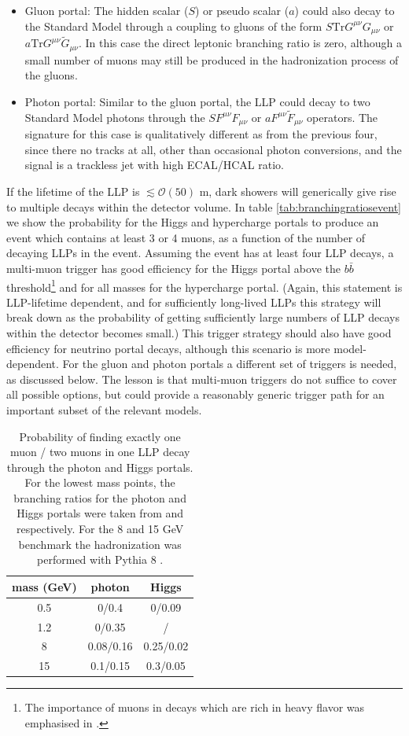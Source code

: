 \begin{itemize}
\item Gluon portal: The hidden scalar ($S$) or pseudo scalar ($a$) could also decay to the Standard Model through a coupling to gluons of the form $S \mathrm{Tr}G^{\mu\nu}G_{\mu\nu}$ or $a \mathrm{Tr}G^{\mu\nu}\tilde G_{\mu\nu}$. In this case the direct leptonic branching ratio is zero, although a small number of muons may still be produced in the hadronization process of the gluons. 

\item Photon portal: Similar to the gluon portal, the LLP could decay to two Standard Model photons through the $S F^{\mu\nu}F_{\mu\nu}$ or $a F^{\mu\nu}\tilde F_{\mu\nu}$ operators. The signature for this case is qualitatively different as from the previous four, since there no tracks at all, other than occasional photon conversions, and the signal is a trackless jet with high ECAL/HCAL ratio. 
\end{itemize}

If the lifetime of the LLP is $\lesssim \mathcal{O}(50)$ m, dark showers will generically give rise to multiple decays within the detector volume.  In table \ref{tab:branchingratiosevent} we show the probability for the Higgs and hypercharge portals to produce an event which contains at least 3 or 4 muons, as a function of the number of decaying LLPs in the event. Assuming the event has at least four LLP decays, a multi-muon trigger has good efficiency for the Higgs portal above the $b\bar b$ threshold\footnote{The importance of muons in decays which are rich in heavy flavor was emphasised in \cite{Strassler:2008fv}.} and for all masses for the hypercharge portal. (Again, this statement is LLP-lifetime dependent, and for sufficiently long-lived LLPs this strategy will break down as the probability of getting sufficiently large numbers of LLP decays within the detector becomes small.) This trigger strategy should also have good efficiency for  neutrino portal decays, although this scenario is more model-dependent. For the gluon and photon portals a different set of triggers is needed, as discussed below. The lesson is that multi-muon triggers do not suffice to cover all possible options, but could provide a reasonably generic trigger path for an important subset of the relevant models.

\begin{table}[h]\centering
\begin{tabular}{|c|cc|}\hline 
mass (GeV)  &photon &Higgs  \\\hline
0.5&0/0.4&0/0.09\\
1.2&0/0.35&/\\
8&0.08/0.16&0.25/0.02\\
15&0.1/0.15&0.3/0.05\\\hline
\end{tabular}
\caption{Probability of finding exactly one muon / two muons in one LLP decay through the photon and Higgs portals. For the lowest mass points, the branching ratios for the photon and Higgs portals were taken from \cite{Meade:2009rb} and \cite{Fradette:2017sdd} respectively. For the 8 and 15 GeV benchmark the hadronization was performed with Pythia 8 \cite{Sjostrand:2006za,Sjostrand:2007gs}.\label{tab:branchingratios}}
\end{table}


